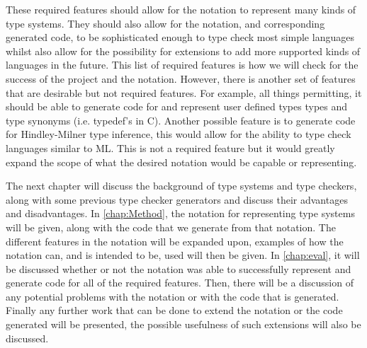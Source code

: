 These required features should allow for the notation to represent many kinds of type systems.
They should also allow for the notation, and corresponding generated code, to be sophisticated enough to type check most simple languages whilst also allow for the possibility for extensions to add more supported kinds of languages in the future.
This list of required features is how we will check for the success of the project and the notation.
However, there is another set of features that are desirable but not required features.
For example, all things permitting, it should be able to generate code for and represent user defined types types and type synonyms (i.e. typedef's in C\cite{kernighan2006c}).
Another possible feature is to generate code for Hindley-Milner type inference\cite{MILNER1978348}, this would allow for the ability to type check languages similar to ML\cite{milner1997definition}. 
This is not a required feature but it would greatly expand the scope of what the desired notation would be capable or representing.

The next chapter will discuss the background of type systems and type checkers, along with some previous type checker generators and discuss their advantages and disadvantages.
In \autoref{chap:Method}, the notation for representing type systems will be given, along with the code that we generate from that notation.
The different features in the notation will be expanded upon, examples of how the notation can, and is intended to be, used will then be given.
In \autoref{chap:eval}, it will be discussed whether or not the notation was able to successfully represent and generate code for all of the required features.
Then, there will be a discussion of any potential problems with the notation or with the code that is generated.
Finally any further work that can be done to extend the notation or the code generated will be presented, the possible usefulness of such extensions will also be discussed.
